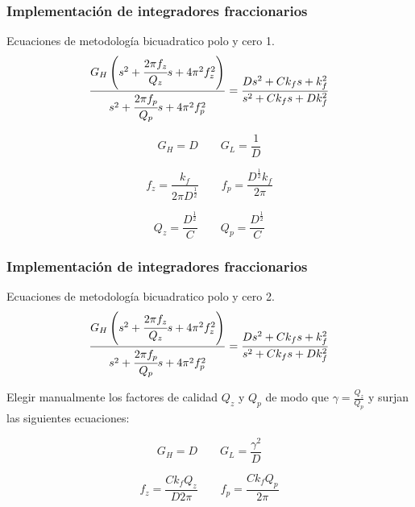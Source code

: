 \documentclass[10pt]{beamer}
\begin{document}
	\begin{frame}
		\frametitle{Implementación de integradores fraccionarios}
		\begin{block}{Ecuaciones de metodología bicuadratico polo y cero 1.}
		\begin{equation}
		\frac{G_{H} \left(  s^{2} + \cfrac{2 \pi f_{z}}{Q_{z}} s + 4 \pi^{2} f_{z}^{2} \right)}{s^{2} + \cfrac{2 \pi f_{p}}{Q_{p}}s + 4\pi^{2} f_{p}^{2} } = \frac{D s^{2} + C k_{f}s + k_{f}^{2}}{s^{2} + C k_{f}s + Dk_{f}^{2}}
		\label{ec:igualdad_segundo_orden}
	\end{equation}
		
	\begin{equation}
		G_{H} = D  \qquad G_{L} = \frac{1}{D}
	\end{equation}
	
	\begin{equation}
		f_{z} = \frac{k_{f}}{2 \pi D^{\frac{1}{2}}} \qquad f_{p} = \frac{D^{\frac{1}{2}} k_{f}}{2 \pi}
	\end{equation}
	
	\begin{equation}
		Q_{z} = \frac{D^{\frac{1}{2}}}{C} \qquad Q_{p} = \frac{D^{\frac{1}{2}}}{C}	
	\end{equation}
	
		\end{block}
	\end{frame}
	\begin{frame}
		\frametitle{Implementación de integradores fraccionarios}
		\begin{block}{Ecuaciones de metodología bicuadratico polo y cero 2.}
		\begin{equation}
		\frac{G_{H} \left(  s^{2} + \cfrac{2 \pi f_{z}}{Q_{z}} s + 4 \pi^{2} f_{z}^{2} \right)}{s^{2} + \cfrac{2 \pi f_{p}}{Q_{p}}s + 4\pi^{2} f_{p}^{2} } = \frac{D s^{2} + C k_{f}s + k_{f}^{2}}{s^{2} + C k_{f}s + Dk_{f}^{2}}
	\end{equation}
		
		Elegir manualmente los factores de calidad $Q_{z}$ y $Q_{p}$ de modo que $\displaystyle{\gamma = \frac{Q_{z}}{Q_{p}}}$ y surjan las siguientes ecuaciones:
		
	\begin{equation}
		G_{H} = D  \qquad G_{L} = \frac{\gamma^{2}}{D}
	\end{equation}
	
	\begin{equation}
		f_{z} = \frac{C k_{f} Q_{z}}{D 2 \pi}	\qquad f_{p} = \frac{C k_{f} Q_{p}}{ 2 \pi}
	\end{equation}
	
		\end{block}
	\end{frame}
\end{document}
